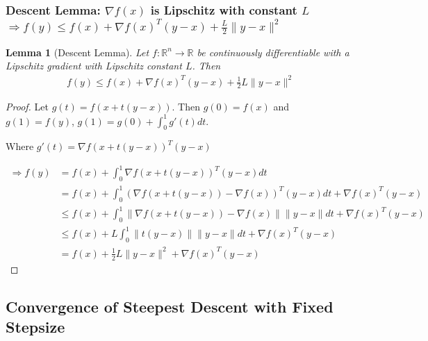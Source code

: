 \documentclass[11pt,a4paper]{article}
\newtheorem{lemma}{Lemma}
\begin{document}
\subsubsection{Descent Lemma: $\nabla f(x)$ is Lipschitz with constant $L$ $\Rightarrow	f(y)\leq f(x)+\nabla f(x)^T(y-x)+\frac{L}{2}\|y-x\|^2$}
\begin{lemma}[Descent Lemma]
Let $f: \mathbb{R}^n \rightarrow \mathbb{R}$ be continuously differentiable with a Lipschitz gradient with Lipschitz constant $L$. Then
\begin{equation}
    \begin{aligned}
        f(y)\leq f(x)+\nabla f(x)^T(y-x)+\frac{1}{2}L\|y-x\|^2
    \end{aligned}
    \nonumber
\end{equation}
\end{lemma}
\begin{proof}
Let $g(t)=f(x+t(y-x))$. Then $g(0)=f(x)$ and $g(1)=f(y)$, $g(1)=g(0)+\int_0^1g'(t)dt$.

Where $g'(t)=\nabla f(x+t(y-x))^T(y-x)$

\begin{equation}
    \begin{aligned}
        \Rightarrow	f(y)&=f(x)+\int_0^1\nabla f(x+t(y-x))^T(y-x)dt\\
        &=f(x)+\int_0^1(\nabla f(x+t(y-x))-\nabla f(x))^T(y-x)dt+\nabla f(x)^T(y-x)\\
        &\leq f(x)+\int_0^1\|\nabla f(x+t(y-x))-\nabla f(x)\|\|y-x\|dt+\nabla f(x)^T(y-x)\\
        &\leq f(x)+L\int_0^1\|t(y-x)\|\|y-x\|dt+\nabla f(x)^T(y-x)\\
        &=f(x)+\frac{1}{2}L\|y-x\|^2+\nabla f(x)^T(y-x)
    \end{aligned}
    \nonumber
\end{equation}
\end{proof}


\subsection{Convergence of Steepest Descent with Fixed Stepsize}
\end{document}
